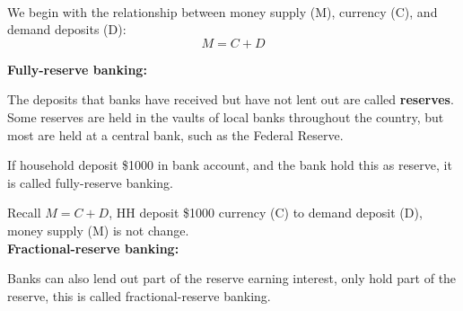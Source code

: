 \documentclass[12pt]{article}
\begin{document}
\noindent{}\\




We begin with the relationship between money supply (M), currency (C), and demand
deposits (D):
\begin{equation*}
M = C + D
\end{equation*}





{\textbf {Fully-reserve banking:}}

The deposits that banks have received but have not lent out are called 
{\textbf {reserves}}.
Some reserves are held in the vaults of local banks throughout the country,
but most are held at a central bank, such as the Federal Reserve.

If household deposit \$1000 in bank account, and the bank hold this as reserve, it
is called fully-reserve banking.

\begin{figure}[H]
\end{figure}

Recall $ M = C + D $, HH deposit \$1000 currency (C) to demand deposit (D), money
supply (M) is not change.\\




{\textbf {Fractional-reserve banking:}}

Banks can also lend out part of the reserve earning interest, only hold part of the 
reserve, this is called fractional-reserve banking.


\begin{figure}[H]
\end{figure}
\end{document}
